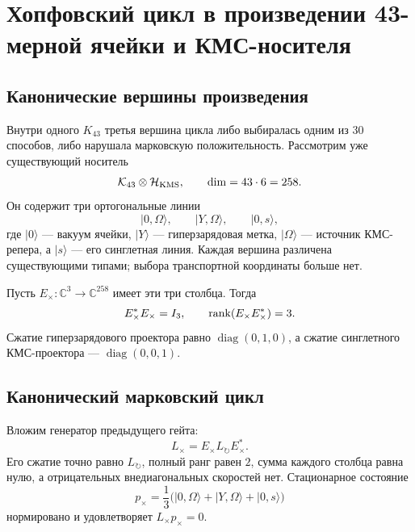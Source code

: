 \chapter{Хопфовский цикл в произведении 43-мерной ячейки и КМС-носителя}
\label{ch:v10-hopf-cycle-k43-kms-product}

\section{Канонические вершины произведения}

Внутри одного $K_{43}$ третья вершина цикла либо выбиралась одним из 30
способов, либо нарушала марковскую положительность. Рассмотрим уже
существующий носитель
\begin{equation}
 \mathcal K_{43}\otimes\mathcal H_{\rm KMS},
 \qquad \dim=43\cdot6=258.
 \label{eq:v10-hopf-product-carrier}
\end{equation}
Он содержит три ортогональные линии
\begin{equation}
 |0,\Omega\rangle,
 \qquad |Y,\Omega\rangle,
 \qquad |0,s\rangle,
 \label{eq:v10-hopf-product-vertices}
\end{equation}
где $|0\rangle$ --- вакуум ячейки, $|Y\rangle$ --- гиперзарядовая метка,
$|\Omega\rangle$ --- источник КМС-репера, а $|s\rangle$ --- его синглетная
линия. Каждая вершина различена существующими типами; выбора транспортной
координаты больше нет.

Пусть $E_\times:\mathbb C^3\to\mathbb C^{258}$ имеет эти три столбца.
Тогда
\begin{equation}
 E_\times^*E_\times=I_3,
 \qquad \operatorname{rank}(E_\times E_\times^*)=3.
 \label{eq:v10-hopf-product-isometry}
\end{equation}
Сжатие гиперзарядового проектора равно $\operatorname{diag}(0,1,0)$, а
сжатие синглетного КМС-проектора --- $\operatorname{diag}(0,0,1)$.

\section{Канонический марковский цикл}

Вложим генератор предыдущего гейта:
\begin{equation}
 L_\times=E_\times L_\circlearrowright E_\times^*.
 \label{eq:v10-hopf-product-generator}
\end{equation}
Его сжатие точно равно $L_\circlearrowright$, полный ранг равен $2$, сумма
каждого столбца равна нулю, а отрицательных внедиагональных скоростей нет.
Стационарное состояние
\begin{equation}
 p_\times=\frac13\bigl(|0,\Omega\rangle+|Y,\Omega\rangle+|0,s\rangle\bigr)
 \label{eq:v10-hopf-product-stationary-state}
\end{equation}
нормировано и удовлетворяет $L_\times p_\times=0$.

